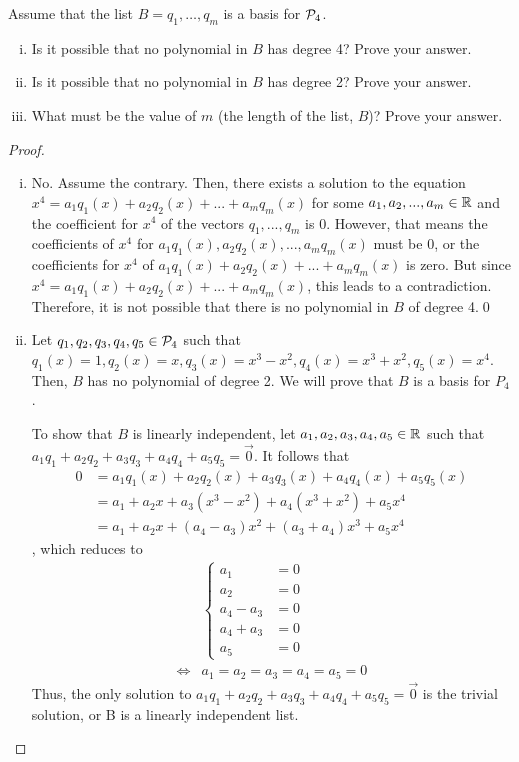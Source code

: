 \begin{question}
	\normalfont
	Assume that the list $B= q_1, \dots, q_m $ \hspace{.1cm} is a basis for $\P_4$.
	\begin{enumerate}[(i)]
		\item Is it possible that no polynomial in $B$ has degree 4? Prove your answer.
		\item Is it possible that no polynomial in $B$ has degree 2? Prove your answer.
		\item What must be the value of $m$ (the length of the list, $B$)?  Prove your answer. \\
	\end{enumerate}
\end{question}
\renewcommand{\qedsymbol}{$\blacksquare$}
\begin{proof}
    \begin{enumerate}[(i)]
        \item No. Assume the contrary. Then, there exists a solution to the equation $x^4=a_1q_1(x)+a_2q_2(x)+...+a_mq_m(x)$ for some $a_1,a_2,...,a_m\in\R$ and the coefficient for $x^4$ of the vectors $q_1,...,q_m$ is $0$.
        However, that means the coefficients of $x^4$ for $a_1q_1(x),a_2q_2(x),...,a_mq_m(x)$ must be 0, or the coefficients for $x^4$ of $a_1q_1(x)+a_2q_2(x)+...+a_mq_m(x)$ is zero. But since $x^4=a_1q_1(x)+a_2q_2(x)+...+a_mq_m(x)$, this leads to a contradiction. Therefore, it is not possible that there is no polynomial in $B$ of degree 4.\qed
        \item Let $q_1,q_2,q_3,q_4,q_5\in\P_4$ such that $q_1(x)=1,q_2(x)=x,q_3(x)=x^3-x^2,q_4(x)=x^3+x^2,q_5(x)=x^4$. Then, $B$ has no polynomial of degree 2. We will prove that $B$ is a basis for $P_4$.
        
        To show that $B$ is linearly independent, let $a_1,a_2,a_3,a_4,a_5\in\R$ such that $a_1q_1+a_2q_2+a_3q_3+a_4q_4+a_5q_5=\vec{0}$. It follows that 
        \[
            \begin{aligned}
                0
                &= a_1q_1(x)+a_2q_2(x)+a_3q_3(x)+a_4q_4(x)+a_5q_5(x)\\
                &= a_1+a_2x+a_3(x^3-x^2)+a_4(x^3+x^2)+a_5x^4\\
                &= a_1+a_2x+(a_4-a_3)x^2+(a_3+a_4)x^3+a_5x^4
            \end{aligned}
        \]
        , which reduces to
        \begin{align*}
            &\begin{cases}
                a_1 &= 0\\
                a_2 &= 0\\
                a_4-a_3 &= 0\\
                a_4+a_3 &= 0\\
                a_5 &= 0   
            \end{cases}\\\iff
            &a_1=a_2=a_3=a_4=a_5=0
        \end{align*}
        Thus, the only solution to $a_1q_1+a_2q_2+a_3q_3+a_4q_4+a_5q_5=\vec{0}$ is the trivial solution, or B is a linearly independent list.


\end{enumerate}
\end{proof}
